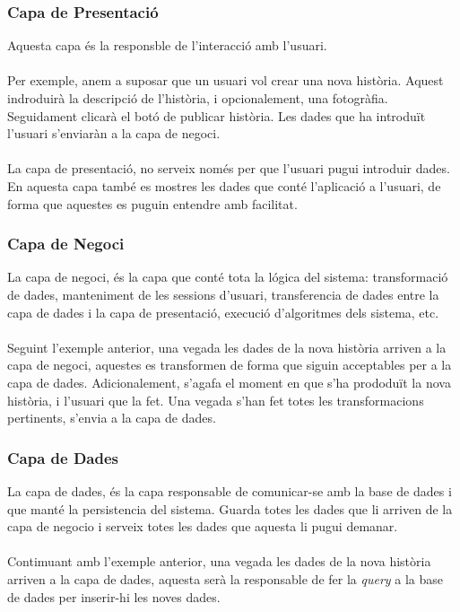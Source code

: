 \documentclass[11pt,catalan,listoffigures,listoftables]{tfgetsinf}
\begin{document}
\subsubsection{Capa de Presentació}

Aquesta capa és la responsble de l'interacció amb l'usuari. \\ \\
Per exemple, anem a suposar que un usuari vol crear una nova història. Aquest indroduirà la descripció de l'història, i opcionalement, una fotogràfia. Seguidament clicarà el botó de publicar història. Les dades que ha introduït l'usuari s'enviaràn a la capa de negoci.\\ \\
La capa de presentació, no serveix només per que l'usuari pugui introduir dades. En aquesta capa també es mostres les dades que conté l'aplicació a l'usuari, de forma que aquestes es puguin entendre amb facilitat.

\subsubsection{Capa de Negoci}

La capa de negoci, és la capa que conté tota la lógica del sistema: transformació de dades, manteniment de les sessions d'usuari, transferencia de dades entre la capa de dades i la capa de presentació, execució d'algoritmes dels sistema, etc. \\ \\
Seguint l'exemple anterior, una vegada les dades de la nova història arriven a la capa de negoci, aquestes es transformen de forma que siguin acceptables per a la capa de dades. Adicionalement, s'agafa el moment en que s'ha prododuït la nova història, i l'usuari que la fet. Una vegada s'han fet totes les transformacions pertinents, s'envia a la capa de dades.

\subsubsection{Capa de Dades}

La capa de dades, és la capa responsable de comunicar-se amb la base de dades i que manté la persistencia del sistema. Guarda totes les dades que li arriven de la capa de negocio i serveix totes les dades que aquesta li pugui demanar.\\ \\
Contimuant amb l'exemple anterior, una vegada les dades de la nova història arriven a la capa de dades, aquesta serà la responsable de fer la \textit{query} a la base de dades per inserir-hi les noves dades.
\end{document}
